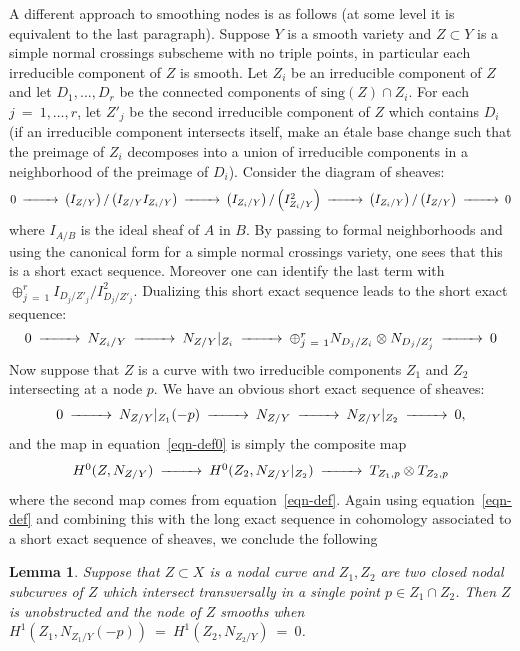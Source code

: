\documentclass[twoside,12pt,reqno]{amsart}
\theoremstyle{plain}
\newtheorem{lem}[thm]{Lemma}
\theoremstyle{definition}
\newcommand{\lt}{\left}
\newcommand{\rt}{\right}
\begin{document}
A different approach to smoothing nodes is as
follows (at some level it is equivalent to the last
paragraph).  Suppose $Y$ is a smooth variety and $Z\subset Y$ is
a simple normal crossings subscheme with no triple points, in
particular each irreducible component of $Z$ is smooth.  Let $Z_i$
be an irreducible component of $Z$ and let $D_1,\dots,D_r$ be the
connected components of $\text{sing}(Z)\cap Z_i$.  For each
$j~=~1,\dots,r$, let $Z'_j$ be the second irreducible component of $Z$
which contains $D_i$ (if an irreducible component intersects itself,
make an \'etale base change such that the preimage of $Z_i$ decomposes 
into a union of irreducible components in a neighborhood of the
preimage of $D_i$).  Consider the diagram of sheaves:
\begin{equation}\begin{CD}
0 @>>>\lt(I_{Z/Y}\rt)/\lt(I_{Z/Y}I_{Z_i/Y}\rt) @>>>
\lt(I_{Z_i/Y}\rt)/\lt(I^2_{Z_i/Y}\rt) @>>>
\lt(I_{Z_i/Y}\rt)/\lt(I_{Z/Y}\rt) @>>> 0
\end{CD}\end{equation}
where $I_{A/B}$ is the ideal sheaf of $A$ in $B$.
By passing to formal neighborhoods and using the canonical form for a
simple normal crossings variety, one sees that this is a short exact
sequence.  Moreover one can identify the last term with
$\oplus_{j~=~1}^r I_{D_j/Z'_j}/I^2_{D_j/Z'_j}$.  Dualizing this short
exact sequence leads to the short exact sequence:
\begin{equation}\label{eqn-def}\begin{CD}
0 @>>> N_{Z_i/Y} @>>> N_{Z/Y}|_{Z_i} @>>> \oplus_{j~=~1}^r
N_{D_j/Z_i}\otimes N_{D_j/Z'_j} @>>> 0
\end{CD}\end{equation}
Now suppose that $Z$ is a curve with two irreducible
components $Z_1$ and $Z_2$ intersecting at a node $p$.  We have an
obvious short exact sequence of sheaves:
\begin{equation}\begin{CD}
0 @>>> N_{Z/Y}|_{Z_1}(-p) @>>> N_{Z/Y} @>>> N_{Z/Y}|_{Z_2} @>>> 0,
\end{CD}\end{equation}
and the map in equation~\ref{eqn-def0} is simply the composite map
\begin{equation}\begin{CD}
H^0(Z,N_{Z/Y}) @>>> H^0(Z_2,N_{Z/Y}|_{Z_2}) @>>> T_{Z_1,p}\otimes
T_{Z_2,p}
\end{CD}\end{equation}
where the second map comes from equation~\ref{eqn-def}.  Again using
equation~\ref{eqn-def} and combining this with the long exact sequence
in cohomology associated to a short exact sequence of sheaves, we
conclude the following
\begin{lem}\label{lem-defo}
Suppose that $Z\subset X$ is a nodal curve and $Z_1,Z_2$ are two
closed nodal subcurves of $Z$ which intersect transversally in a
single point $p\in Z_1\cap Z_2$.  
Then $Z$ is unobstructed and the node of $Z$ smooths when
$H^1(Z_1,N_{Z_1/Y}(-p))~=~H^1(Z_2,N_{Z_2/Y})~=~0$.  
\end{lem}
\end{document}
